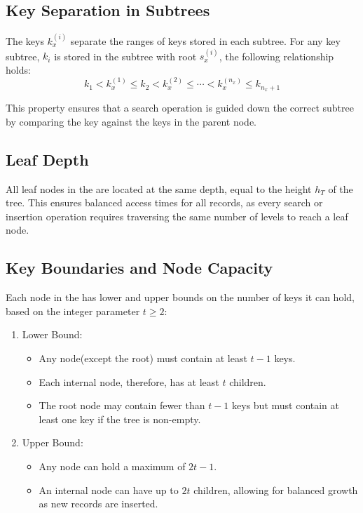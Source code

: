 \subsection{Key Separation in Subtrees}
    
The keys $k_x^{(i)}$ separate the ranges of keys stored in each subtree. For any key subtree, $k_i$ is stored in the subtree with root $s_x^{(i)}$, the following relationship holds:  $$k_1<k_x^{(1)}\le k_2<k_x^{(2)}\le \cdots <k_x^{(n_x)}\le k_{n_x+1}$$

This property ensures that a search operation is guided down the correct subtree by comparing the key against the keys in the parent node.

\subsection{Leaf Depth}
All leaf nodes in the \bplustree are located at the same depth, equal to the height $h_T$ of the tree. This ensures balanced access times for all records, as every search or insertion operation requires traversing the same number of levels to reach a leaf node.

\subsection{Key Boundaries and Node Capacity}
Each node in the \bplustree has lower and upper bounds on the number of keys it can hold, based on the integer parameter $t\ge 2$:
\begin{enumerate}
    \item Lower Bound:
    \begin{itemize}
        \item Any node(except the root) must contain at least $t-1$ keys.
        \item Each internal node, therefore, has at least $t$ children.
        \item The root node may contain fewer than $t-1$ keys but must contain at least one key if the tree is non-empty.
    \end{itemize}

    \item Upper Bound:
    \begin{itemize}
        \item Any node can hold a maximum of $2t-1$.
        \item An internal node can have up to $2t$ children, allowing for balanced growth as new records are inserted.
    \end{itemize}
    
\end{enumerate}

